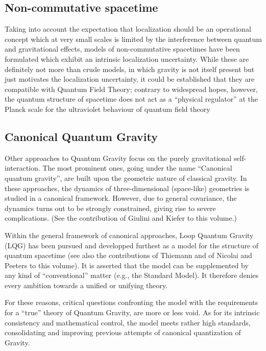\documentclass[multphys,vecphys]{svmult}
\begin{document}
\subsection{Non-commutative spacetime}

Taking into account the expectation that localization
should be an operational concept which at very small scales is limited
by the interference between quantum and gravitational
effects, models of non-commutative
spacetimes have been formulated which exhibit an intrinsic
localization uncertainty.  
While these are definitely not more than crude models, in which gravity 
is not itself present but just motivates the localization uncertainty,
it could be established that they are compatible with Quantum Field
Theory; contrary to widespread hopes, however, the quantum structure of 
spacetime does not act as a ``physical regulator'' at the
Planck scale for the
ultraviolet behaviour of quantum
field theory \cite{BDFP}

\subsection{Canonical Quantum Gravity}

Other approaches to Quantum Gravity focus on the purely 
gravitational self-interaction. The most
prominent ones, going under the name ``Canonical quantum gravity'',
are built upon the geometric nature of classical gravity. In these
approaches, the dynamics of three-dimensional (space-like) geometries
is studied in a canonical framework. However, due to general
covariance, the dynamics turns out to be
strongly constrained, giving rise to severe complications. (See the
contribution of Giulini and Kiefer to this volume.)  

Within the general framework of canonical approaches, Loop Quantum
Gravity (LQG) has been pursued and developped furthest as a model for the
structure of quantum spacetime \cite{A} (see also the contributions of
Thiemann and of Nicolai and Peeters to this volume). It is asserted
that the model can be supplemented by any kind of ``conventional''
matter (e.g., the Standard Model). It therefore denies every ambition
towards a unified or unifying theory.  

For these reasons, critical questions confronting the model with
the requirements for a ``true'' theory of Quantum Gravity, are more
or less void. As for its intrinsic consistency and mathematical
control, the model meets rather high standards, consolidating and
improving previous attempts of canonical
quantization of Gravity.
\end{document}
